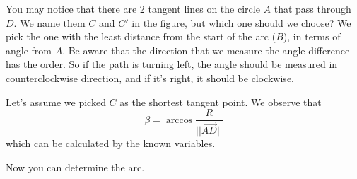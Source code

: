 \documentclass{article}
\begin{document}
You may notice that there are 2 tangent lines on the circle $A$ that pass through $D$.
We name them $C$ and $C'$ in the figure, but which one should we choose?
We pick the one with the least distance from the start of the arc ($B$), in terms of angle from $A$.
Be aware that the direction that we measure the angle difference has the order.
So if the path is turning left, the angle should be measured in counterclockwise direction, and if it's right, it should be clockwise.

Let's assume we picked $C$ as the shortest tangent point.
We observe that
$$
\beta = \arccos{\frac{R}{||\vec{AD}||}}
$$
which can be calculated by the known variables.

Now you can determine the arc.
\end{document}
